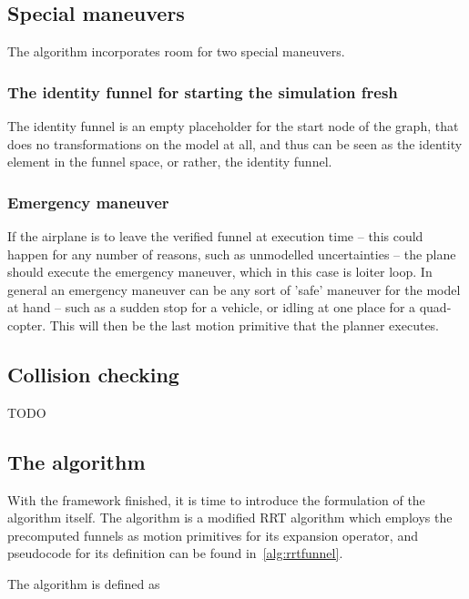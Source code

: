 \subsection{Special maneuvers}

The algorithm incorporates room for two special maneuvers.

\subsubsection{The identity funnel for starting the simulation fresh}

The identity funnel is an empty placeholder for the start node of the graph,
that does no transformations on the model at all, and thus can be seen as the
identity element in the funnel space, or rather, the identity funnel.

\subsubsection{Emergency maneuver}

If the airplane is to leave the verified funnel at execution time -- this could
happen for any number of reasons, such as unmodelled uncertainties -- the plane
should execute the emergency maneuver, which in this case is loiter loop. In
general an emergency maneuver can be any sort of 'safe' maneuver for the model
at hand -- such as a sudden stop for a vehicle, or idling at one place for a
quad-copter. This will then be the last motion primitive that the planner
executes.

\subsection{Collision checking}

TODO

\subsection{The \rrtfunnel{} algorithm}

With the framework finished, it is time to introduce the formulation of the
\rrtfunnel{} algorithm itself. The \rrtfunnel{} algorithm is a modified \ac{RRT}
algorithm which employs the precomputed funnels as motion primitives for its
expansion operator, and pseudocode for its definition can be found
in~\cref{alg:rrtfunnel}.


The \rrtfunnel{} algorithm is defined as

